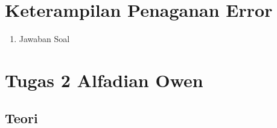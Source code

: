 \section{Keterampilan Penaganan Error}
\begin{enumerate}
\item Jawaban Soal 


\end{enumerate}


\section{Tugas 2 Alfadian Owen}
\subsection{Teori}
